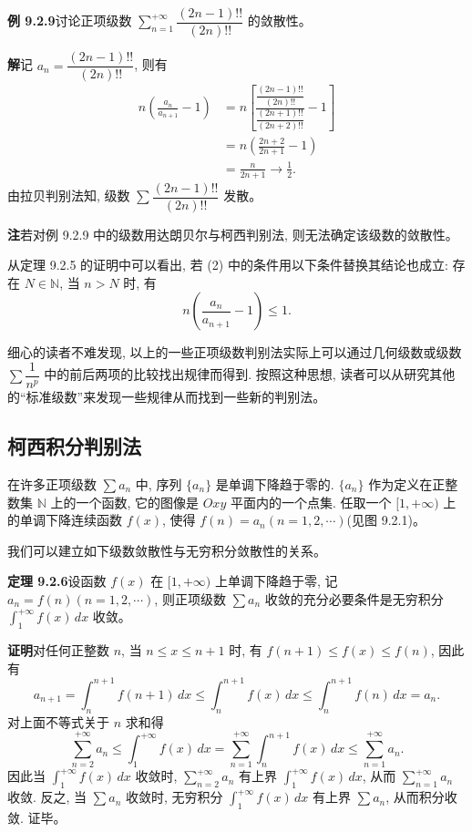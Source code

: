 \documentclass[UTF8, 12pt, fontset=fandol, oneside]{ctexart}
\begin{document}
\noindent\textbf{例 9.2.9}\quad 讨论正项级数 $\sum\limits_{n=1}^{+\infty}\dfrac{(2n-1)!!}{(2n)!!}$ 的敛散性。

\noindent\textbf{解}\quad 记 $a_n=\dfrac{(2n-1)!!}{(2n)!!}$, 则有
\[
\begin{aligned}
  n\left(\frac{a_n}{a_{n+1}}-1\right)
  &=n\left[\frac{\dfrac{(2n-1)!!}{(2n)!!}}{\dfrac{(2n+1)!!}{(2n+2)!!}}-1\right]\\
  &=n\left(\frac{2n+2}{2n+1}-1\right)\\
  &=\frac{n}{2n+1}\to\frac12.
\end{aligned}
\]
由拉贝判别法知, 级数 $\sum\dfrac{(2n-1)!!}{(2n)!!}$ 发散。

\noindent\textbf{注}\quad 若对例 9.2.9 中的级数用达朗贝尔与柯西判别法, 则无法确定该级数的敛散性。

从定理 9.2.5 的证明中可以看出, 若 (2) 中的条件用以下条件替换其结论也成立: 存在 $N\in\mathbb{N}$, 当 $n>N$ 时, 有
\[
  n\left(\frac{a_n}{a_{n+1}}-1\right)\leq1.
\]

细心的读者不难发现, 以上的一些正项级数判别法实际上可以通过几何级数或级数 $\sum\dfrac1{n^p}$ 中的前后两项的比较找出规律而得到. 按照这种思想, 读者可以从研究其他的``标准级数''来发现一些规律从而找到一些新的判别法。

\subsection{柯西积分判别法}

在许多正项级数 $\sum a_n$ 中, 序列 $\{a_n\}$ 是单调下降趋于零的. $\{a_n\}$ 作为定义在正整数集 $\mathbb{N}$ 上的一个函数, 它的图像是 $Oxy$ 平面内的一个点集. 任取一个 $[1,+\infty)$ 上的单调下降连续函数 $f(x)$, 使得 $f(n)=a_n(n=1,2,\cdots)$(见图 9.2.1)。

我们可以建立如下级数敛散性与无穷积分敛散性的关系。

\noindent\textbf{定理 9.2.6}\quad 设函数 $f(x)$ 在 $[1,+\infty)$ 上单调下降趋于零, 记 $a_n=f(n)(n=1,2,\cdots)$, 则正项级数 $\sum a_n$ 收敛的充分必要条件是无穷积分 $\int_1^{+\infty}f(x)\,dx$ 收敛。

\noindent\textbf{证明}\quad 对任何正整数 $n$, 当 $n\leq x\leq n+1$ 时, 有 $f(n+1)\leq f(x)\leq f(n)$, 因此有
\[
  a_{n+1}=\int_n^{n+1}f(n+1)\,dx\leq\int_n^{n+1}f(x)\,dx\leq\int_n^{n+1}f(n)\,dx=a_n.
\]
对上面不等式关于 $n$ 求和得
\[
  \sum_{n=2}^{+\infty}a_n\leq\int_1^{+\infty}f(x)\,dx
  =\sum_{n=1}^{+\infty}\int_n^{n+1}f(x)\,dx
  \leq\sum_{n=1}^{+\infty}a_n.
\]
因此当 $\int_1^{+\infty}f(x)\,dx$ 收敛时, $\sum\limits_{n=2}^{+\infty}a_n$ 有上界 $\int_1^{+\infty}f(x)\,dx$, 从而 $\sum\limits_{n=1}^{+\infty}a_n$ 收敛. 反之, 当 $\sum a_n$ 收敛时, 无穷积分 $\int_1^{+\infty}f(x)\,dx$ 有上界 $\sum a_n$, 从而积分收敛. 证毕。
\end{document}

